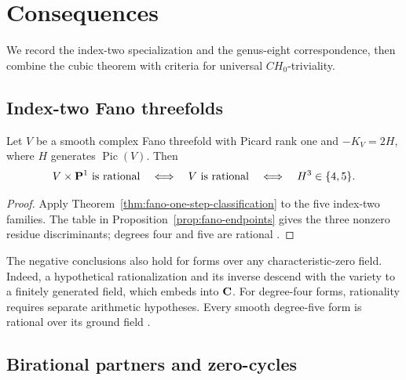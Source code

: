 \section{Consequences}
\label{sec:applications}

We record the index-two specialization and the genus-eight correspondence,
then combine the cubic theorem with criteria for universal \(CH_0\)-triviality.

\subsection{Index-two Fano threefolds}

\begin{theorem}
\label{thm:index-two-classification}
%
%
%
Let \(V\) be a smooth complex Fano threefold with Picard rank one and
\(-K_V=2H\), where \(H\) generates \(\operatorname{Pic}(V)\).  Then
\[
 V\times\mathbf P^1\text{ is rational}
 \quad\Longleftrightarrow\quad V\text{ is rational}
 \quad\Longleftrightarrow\quad H^3\in\{4,5\}.
\]
\end{theorem}

\begin{proof}
Apply Theorem~\ref{thm:fano-one-step-classification} to the five index-two
families. The table in Proposition~\ref{prop:fano-endpoints} gives the
three nonzero residue discriminants; degrees four and five are rational
\cite[Section~2.3, Theorems~2.7, 3.3 and~3.5]{KuznetsovProkhorov}.
%
%
\end{proof}

The negative conclusions also hold for forms over any characteristic-zero field.
Indeed, a hypothetical rationalization and its inverse descend with the
variety to a finitely generated field, which embeds into \(\mathbf C\).
For degree-four forms, rationality requires separate arithmetic hypotheses.
Every smooth degree-five form is rational over its ground field
\cite[Theorem~3.3]{KuznetsovProkhorov}.

\subsection{Birational partners and zero-cycles}

